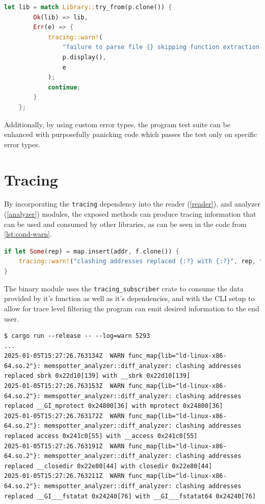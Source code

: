 \begin{lstlisting}[caption=\label{lst:err_handling}{Custom error handling example}, language=Rust]
let lib = match Library::try_from(p.clone()) {
        Ok(lib) => lib,
        Err(e) => {
            tracing::warn!(
                "failure to parse file {} skipping function extraction ({})",
                p.display(),
                e
            );
            continue;
        }
    };
\end{lstlisting}

Additionally, by using custom error types, the program test suite can be enhanced with purposefully panicking code which passes the test only on specific error types.

\section{Tracing}

By incorporating the \verb|tracing| \cite{tokio-rs_team_tokio-rstracing_2024} dependency into the reader (\autoref{reader}), and analyzer (\autoref{analyzer}) modules, the exposed methods can produce tracing information that can be used and consumed by other libraries, as can be seen in the code from \autoref{lst:cond-warn}.

\begin{lstlisting}[language=Rust, caption=\label{lst:cond-warn}{Code fragment showcasing conditionally emiting a warning}]
if let Some(rep) = map.insert(addr, f.clone()) {
    tracing::warn!("clashing addresses replaced {:?} with {:?}", rep, f);
}
\end{lstlisting}

The binary module uses the \verb|tracing_subscriber| \cite{tokio-rs_team_tokiotracingtracing-subscriber_2024} crate to consume the data provided by it's function as well as it's dependencies, and with the CLI setup to allow for trace level filtering the program can emit desired information to the end user.

\begin{lstlisting}[breaklines=true, caption=\label{lst:logs}{Fraction of the warnings emitted by the program with the log setting at warning level}]
$ cargo run --release -- --log=warn 5293
...
2025-01-05T15:27:26.763134Z  WARN func_map{lib="ld-linux-x86-64.so.2"}: memspotter_analyzer::diff_analyzer: clashing addresses replaced sbrk 0x22d10[139] with __sbrk 0x22d10[139]
2025-01-05T15:27:26.763153Z  WARN func_map{lib="ld-linux-x86-64.so.2"}: memspotter_analyzer::diff_analyzer: clashing addresses replaced __GI_mprotect 0x24800[36] with mprotect 0x24800[36]
2025-01-05T15:27:26.763172Z  WARN func_map{lib="ld-linux-x86-64.so.2"}: memspotter_analyzer::diff_analyzer: clashing addresses replaced access 0x241c0[55] with __access 0x241c0[55]
2025-01-05T15:27:26.763191Z  WARN func_map{lib="ld-linux-x86-64.so.2"}: memspotter_analyzer::diff_analyzer: clashing addresses replaced __closedir 0x22e80[44] with closedir 0x22e80[44]
2025-01-05T15:27:26.763211Z  WARN func_map{lib="ld-linux-x86-64.so.2"}: memspotter_analyzer::diff_analyzer: clashing addresses replaced __GI___fstatat 0x24240[76] with __GI___fstatat64 0x24240[76]
\end{lstlisting}

